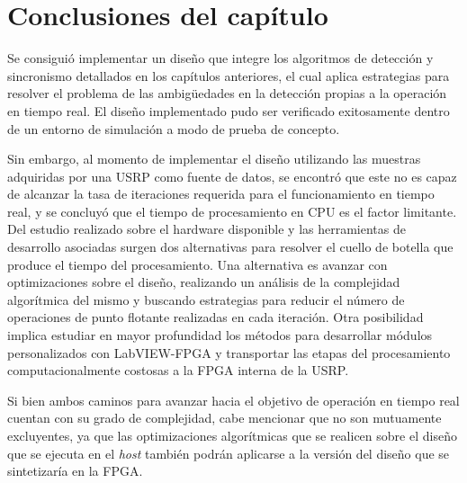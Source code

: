 \section{Conclusiones del capítulo}

Se consiguió implementar un diseño que integre los algoritmos de detección y sincronismo detallados en los capítulos anteriores, el cual aplica estrategias para resolver el problema de las ambigüedades en la detección propias a la operación en tiempo real. El diseño implementado pudo ser verificado exitosamente dentro de un entorno de simulación a modo de prueba de concepto.

Sin embargo, al momento de implementar el diseño utilizando las muestras adquiridas por una USRP como fuente de datos, se encontró que este no es capaz de alcanzar la tasa de iteraciones requerida para el funcionamiento en tiempo real, y se concluyó que el tiempo de procesamiento en CPU es el factor limitante. Del estudio realizado sobre el hardware disponible y las herramientas de desarrollo asociadas surgen dos alternativas para resolver el cuello de botella que produce el tiempo del procesamiento. Una alternativa es avanzar con optimizaciones sobre el diseño, realizando un análisis de la complejidad algorítmica del mismo y buscando estrategias para reducir el número de operaciones de punto flotante realizadas en cada iteración. Otra posibilidad implica estudiar en mayor profundidad los métodos para desarrollar módulos personalizados con LabVIEW-FPGA y transportar las etapas del procesamiento computacionalmente costosas a la FPGA interna de la USRP. 

Si bien ambos caminos para avanzar hacia el objetivo de operación en tiempo real cuentan con su grado de complejidad, cabe mencionar que no son mutuamente excluyentes, ya que las optimizaciones algorítmicas que se realicen sobre el diseño que se ejecuta en el \textit{host} también podrán aplicarse a la versión del diseño que se sintetizaría en la FPGA. 





